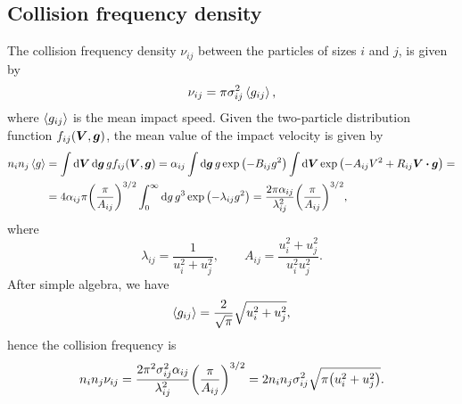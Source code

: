\documentclass[aps,prl,preprint,groupedaddress,10pt]{revtex4-2}
\begin{document}
\subsection{Collision frequency density}
The collision frequency density $\nu_{ij}$ between the particles of sizes $i$ and $j$,
is given by
\begin{equation}
    \nu_{ij}=\pi\sigma_{ij}^2\left\langle{g_{ij}}\right\rangle,
\end{equation}
where $\left\langle{g_{ij}}\right\rangle$ is the mean impact speed. Given the two-particle distribution function
$f_{ij}(\vb*{V},\vb*{g})$, the mean value of the impact velocity is given by
\begin{equation}
    \begin{split}
        n_in_j\avg{g}&=\int\dd{\bV}\dd{\bg}g f_{ij}(\bV,\bg)=
        \alpha_{ij}\int\dd{\bg} g\exp\pqty{-B_{ij}g^2}
        \int\dd{\bV}\exp\pqty{-A_{ij}V^2+R_{ij}\bV\vdot\bg}=\\
        &=4\alpha_{ij}\pi\pqty{\frac{\pi}{A_{ij}}}^{3/2}\int_{0}^{\infty}\dd{g} g^3
        \exp\pqty{-\lambda_{ij}g^2}=
        \frac{2\pi\alpha_{ij}}{\lambda_{ij}^2}\pqty{\frac{\pi}{A_{ij}}}^{3/2},
    \end{split}
\end{equation}
where
\begin{equation}
    \lambda_{ij}=\frac{1}{u_i^2+u_j^2},\qquad
    A_{ij}=\frac{u_i^2+u_j^2}{u_i^2u_j^2}.
\end{equation}
After simple algebra, we have
\begin{equation}
    \left\langle{g_{ij}}\right\rangle=\frac{2}{\sqrt{\pi}}\sqrt{u_i^2+u_j^2},
\end{equation}
hence the collision frequency is
\begin{equation}
    n_in_j\nu_{ij}=\frac{2\pi^2\sigma_{ij}^2\alpha_{ij}}{\lambda_{ij}^2}
    \pqty{\frac{\pi}{A_{ij}}}^{3/2}=2n_in_j\sigma_{ij}^2\sqrt{\pi\pqty{u_i^2+u_j^2}}.
\end{equation}
\end{document}
